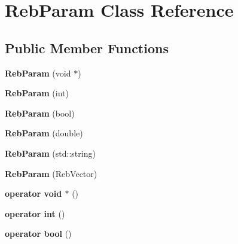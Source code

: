 \hypertarget{class_reb_param}{}\section{Reb\+Param Class Reference}
\label{class_reb_param}
\subsection*{Public Member Functions}
\begin{DoxyCompactItemize}
\item 
{\bfseries Reb\+Param} (void $\ast$)\hypertarget{class_reb_param_ad78549e3a9f963af36180d929feace11}{}\label{class_reb_param_ad78549e3a9f963af36180d929feace11}

\item 
{\bfseries Reb\+Param} (int)\hypertarget{class_reb_param_a13998ea93cad21e5627233575f8bc3bb}{}\label{class_reb_param_a13998ea93cad21e5627233575f8bc3bb}

\item 
{\bfseries Reb\+Param} (bool)\hypertarget{class_reb_param_adcc97b1ae490bff862f24d3812e066f0}{}\label{class_reb_param_adcc97b1ae490bff862f24d3812e066f0}

\item 
{\bfseries Reb\+Param} (double)\hypertarget{class_reb_param_af4d69bdb81be9372f5d8dff1abd8610c}{}\label{class_reb_param_af4d69bdb81be9372f5d8dff1abd8610c}

\item 
{\bfseries Reb\+Param} (std\+::string)\hypertarget{class_reb_param_a2c8a7c8a5f1e5fe1de79206f57a57984}{}\label{class_reb_param_a2c8a7c8a5f1e5fe1de79206f57a57984}

\item 
{\bfseries Reb\+Param} (Reb\+Vector)\hypertarget{class_reb_param_a9890d8be261a1cb994426d31c112594c}{}\label{class_reb_param_a9890d8be261a1cb994426d31c112594c}

\item 
{\bfseries operator void $\ast$} ()\hypertarget{class_reb_param_a64bf3c4fe012bbd3a09c7d5f7228c1d6}{}\label{class_reb_param_a64bf3c4fe012bbd3a09c7d5f7228c1d6}

\item 
{\bfseries operator int} ()\hypertarget{class_reb_param_ab88c8c21b4d3fa2b308f9b9db98640b2}{}\label{class_reb_param_ab88c8c21b4d3fa2b308f9b9db98640b2}

\item 
{\bfseries operator bool} ()\hypertarget{class_reb_param_a0a7220a816d5bcf9e6b567f393fb84ce}{}\label{class_reb_param_a0a7220a816d5bcf9e6b567f393fb84ce}


\end{DoxyCompactItemize}

